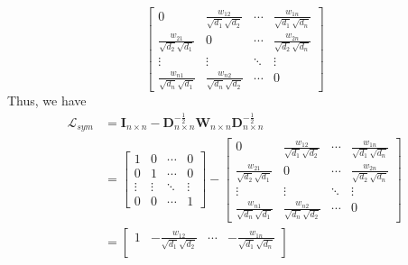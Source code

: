 \documentclass[oneside]{book}
\begin{document}
{{\[                \begin{bmatrix}
                    0                                       & \frac{w_{12}}{\sqrt{d_{1}}\sqrt{d_{2}}} & \cdots & \frac{w_{1n}}{\sqrt{d_{1}}\sqrt{d_{n}}}\\
                    \frac{w_{21}}{\sqrt{d_{2}}\sqrt{d_{1}}} & 0                                       & \cdots & \frac{w_{2n}}{\sqrt{d_{2}}\sqrt{d_{n}}}\\
                    \vdots                                  & \vdots                                  & \ddots & \vdots\\
                    \frac{w_{n1}}{\sqrt{d_{n}}\sqrt{d_{1}}} & \frac{w_{n2}}{\sqrt{d_{n}}\sqrt{d_{2}}} & \cdots & 0
                \end{bmatrix}
        \]
        Thus, we have
        \begin{align}
            \mathcal{L}_{sym}
                &=\mathbf{I}_{n \times n}-\mathbf{D}_{n \times n}^{-\frac{1}{2}}\mathbf{W}_{n \times n}\mathbf{D}_{n \times n}^{-\frac{1}{2}}\\
                &=
                \begin{bmatrix}
                    1      & 0      & \cdots & 0\\
                    0      & 1      & \cdots & 0\\
                    \vdots & \vdots & \ddots & \vdots\\
                    0      & 0      & \cdots & 1
                \end{bmatrix}
                -
                \begin{bmatrix}
                    0                                       & \frac{w_{12}}{\sqrt{d_{1}}\sqrt{d_{2}}} & \cdots & \frac{w_{1n}}{\sqrt{d_{1}}\sqrt{d_{n}}}\\
                    \frac{w_{21}}{\sqrt{d_{2}}\sqrt{d_{1}}} & 0                                       & \cdots & \frac{w_{2n}}{\sqrt{d_{2}}\sqrt{d_{n}}}\\
                    \vdots                                  & \vdots                                  & \ddots & \vdots\\
                    \frac{w_{n1}}{\sqrt{d_{n}}\sqrt{d_{1}}} & \frac{w_{n2}}{\sqrt{d_{n}}\sqrt{d_{2}}} & \cdots & 0
                \end{bmatrix}\\
                &=
                \begin{bmatrix}
                    1                                        & -\frac{w_{12}}{\sqrt{d_{1}}\sqrt{d_{2}}} & \cdots & -\frac{w_{1n}}{\sqrt{d_{1}}\sqrt{d_{n}}}\\

\end{bmatrix}
\end{align}}}
\end{document}
